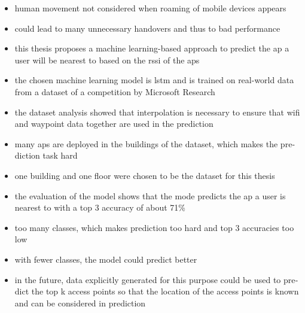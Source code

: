 \null\vfil
\begin{otherlanguage}{english}
\begin{center}\textsf{\textbf{\abstractname}}\end{center}

\noindent 
\begin{itemize}
    \item human movement not considered when roaming of mobile devices appears
    \item could lead to many unnecessary handovers and thus to bad performance
    \item this thesis proposes a machine learning-based approach to predict the \ac{ap} a user will be nearest to based on the \ac{rssi} of the \acp{ap}
    \item the chosen machine learning model is \ac{lstm} and is trained on real-world data from a dataset of a competition by Microsoft Research %
    \item the dataset analysis showed that interpolation is necessary to ensure that \ac{wifi} and waypoint data together are used in the prediction
    \item many \acp{ap} are deployed in the buildings of the dataset, which makes the prediction task hard
    \item one building and one floor were chosen to be the dataset for this thesis
    \item the evaluation of the model shows that the mode predicts the \ac{ap} a user is nearest to with a top 3 accuracy of about 71\%
    \item too many classes, which makes prediction too hard and top 3 accuracies too low
    \item with fewer classes, the model could predict better
    \item in the future, data explicitly generated for this purpose could be used to predict the top k access points so that the location of the access points is known and can be considered in prediction
\end{itemize}

\end{otherlanguage}
\vfil\null

